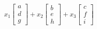 \documentclass[preview]{standalone}
\begin{document}
\begin{align*}
x_1 \begin{bmatrix} a \\ d \\ g \end{bmatrix} +x_2 \begin{bmatrix} b \\ e \\ h \end{bmatrix} +x_3 \begin{bmatrix} c \\ f \\ i \end{bmatrix}
\end{align*}
\end{document}
